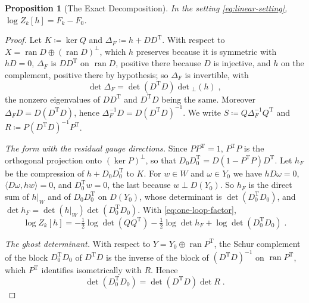 \documentclass[11pt]{preprint}
\numberwithin{equation}{section}
\theoremstyle{definition}
\theoremstyle{remark}
\theoremstyle{plain}
\newtheorem{auxproposition}[lemma]{Proposition}
\begin{document}
\begin{auxproposition}[The Exact Decomposition]\label{prop:exact-decomposition}
In the setting \eqref{eq:linear-setting}, $\log Z_k[h] = F_k - F_0$.
\end{auxproposition}

\begin{proof}
Let $K \coloneqq \ker Q$ and $\Delta_F \coloneqq h + DD^{\mathrm T}$. With respect to $X = \operatorname{ran}D \oplus (\operatorname{ran}D)^\perp$, which $h$ preserves because it is symmetric with $hD = 0$, $\Delta_F$ is $DD^{\mathrm T}$ on $\operatorname{ran}D$, positive there because $D$ is injective, and $h$ on the complement, positive there by hypothesis; so $\Delta_F$ is invertible, with
\begin{equation}\label{eq:feynman-determinant}
    \det\Delta_F = \det(D^{\mathrm T}D)\det{}_\perp(h)\;,
\end{equation}
the nonzero eigenvalues of $DD^{\mathrm T}$ and $D^{\mathrm T}D$ being the same. Moreover $\Delta_FD = D(D^{\mathrm T}D)$, hence $\Delta_F^{-1}D = D(D^{\mathrm T}D)^{-1}$. We write $S \coloneqq Q\Delta_F^{-1}Q^{\mathrm T}$ and $R \coloneqq P(D^{\mathrm T}D)^{-1}P^{\mathrm T}$.

\emph{The form with the residual gauge directions.} Since $PP^{\mathrm T} = 1$, $P^{\mathrm T}P$ is the orthogonal projection onto $(\ker P)^\perp$, so that $D_0D_0^{\mathrm T} = D(1 - P^{\mathrm T}P)D^{\mathrm T}$. Let $h_F$ be the compression of $h + D_0D_0^{\mathrm T}$ to $K$. For $w \in W$ and $\omega \in Y_0$ we have $hD\omega = 0$, $\langle D\omega, hw \rangle = 0$, and $D_0^{\mathrm T}w = 0$, the last because $w \perp D(Y_0)$. So $h_F$ is the direct sum of $h|_W$ and of $D_0D_0^{\mathrm T}$ on $D(Y_0)$, whose determinant is $\det(D_0^{\mathrm T}D_0)$, and $\det h_F = \det(h|_W)\det(D_0^{\mathrm T}D_0)$. With \eqref{eq:one-loop-factor},
\begin{equation}\label{eq:one-loop-feynman}
    \log Z_k[h] = -\tfrac12\log\det(QQ^{\mathrm T}) - \tfrac12\log\det h_F + \log\det(D_0^{\mathrm T}D_0)\;.
\end{equation}

\emph{The ghost determinant.} With respect to $Y = Y_0 \oplus \operatorname{ran}P^{\mathrm T}$, the Schur complement of the block $D_0^{\mathrm T}D_0$ of $D^{\mathrm T}D$ is the inverse of the block of $(D^{\mathrm T}D)^{-1}$ on $\operatorname{ran}P^{\mathrm T}$, which $P^{\mathrm T}$ identifies isometrically with $R$. Hence
\begin{equation}\label{eq:ghost-schur}
    \det(D_0^{\mathrm T}D_0) = \det(D^{\mathrm T}D)\det R\;.
\end{equation}


\end{proof}
\end{document}
